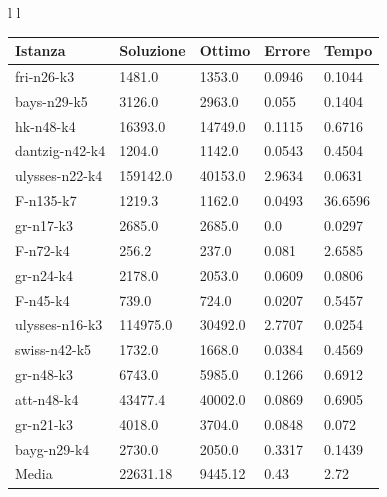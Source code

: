 \documentclass[]{article}
\begin{document}
\begin{tabular}{l l}
\small

			\begin{tabular}{||l | l l l l||} 
				\hline
				Istanza & Soluzione & Ottimo & Errore & Tempo \\ [0.5ex] 
				\hline\hline
				fri-n26-k3 & 1481.0 & 1353.0 & 0.0946 & 0.1044  \\
				bays-n29-k5 & 3126.0 & 2963.0 & 0.055 & 0.1404  \\
				hk-n48-k4 & 16393.0 & 14749.0 & 0.1115 & 0.6716  \\
				dantzig-n42-k4 & 1204.0 & 1142.0 & 0.0543 & 0.4504  \\
				\rowcolor{red}
				ulysses-n22-k4 &  \cellcolor{red} 159142.0 & 40153.0 & 2.9634 &  \cellcolor{red}  0.0631  \\
				\rowcolor{white}
				F-n135-k7 & 1219.3 & 1162.0 & 0.0493 & 36.6596  \\
				gr-n17-k3 & 2685.0 & 2685.0 &  \cellcolor{green} 0.0 & 0.0297  \\
				F-n72-k4 & 256.2 & 237.0 & 0.081 & 2.6585  \\
				gr-n24-k4 & 2178.0 & 2053.0 & 0.0609 & 0.0806  \\
				F-n45-k4 & 739.0 & 724.0 & 0.0207 & 0.5457  \\
				\rowcolor{red}
				ulysses-n16-k3 &  \cellcolor{red} 114975.0 & 30492.0 & 2.7707 &  \cellcolor{red} 0.0254  \\
				\rowcolor{white}
				swiss-n42-k5 & 1732.0 & 1668.0 & 0.0384 & 0.4569  \\
				gr-n48-k3 & 6743.0 & 5985.0 & 0.1266 & 0.6912  \\
				att-n48-k4 & 43477.4 & 40002.0 & 0.0869 & 0.6905  \\
				gr-n21-k3 & 4018.0 & 3704.0 & 0.0848 & 0.072  \\
				bayg-n29-k4 & 2730.0 & 2050.0 & 0.3317 & 0.1439  \\
				\hline
				Media & 22631.18 & 9445.12 & 0.43 & 2.72  \\
				[1ex] 
				\hline
			\end{tabular}


\end{tabular}
\end{document}
